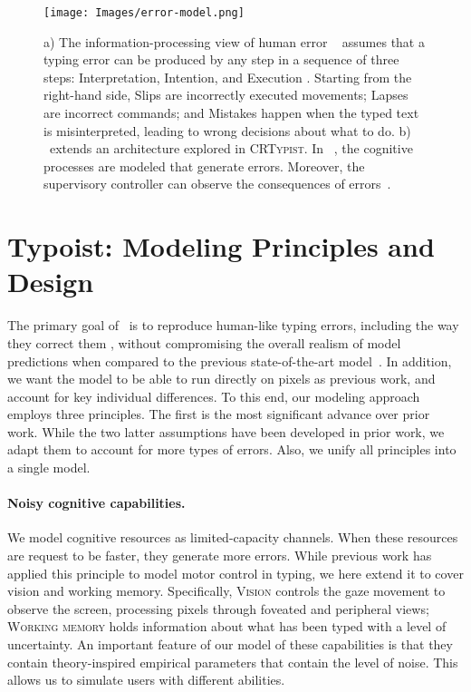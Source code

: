\begin{figure}[!t]
\centering
  \texttt{[image: Images/error-model.png]}
  \caption{
  a) The information-processing view of human error ~\cite{wickens2021engineering} assumes that a typing error can be produced by any step in a sequence of three steps: Interpretation, Intention, and Execution . 
  Starting from the right-hand side, Slips are incorrectly executed movements; 
  Lapses are incorrect commands; and Mistakes happen when the typed text is misinterpreted, leading to wrong decisions about what to do.
  b) ~\name extends an architecture explored in \textsc{CRTypist}. In ~\name, the cognitive processes are modeled that generate errors. Moreover, the supervisory controller can observe the consequences of errors~\cite{shi2024crtypist}.}
  \label{fig:model}
\end{figure}

\section{Typoist: Modeling Principles and Design}

The primary goal of ~\name is to reproduce human-like typing errors, including the way they correct them \cite{pinet2022correction}, without compromising the overall realism of model predictions when compared to the previous state-of-the-art model~\cite{shi2024crtypist}. In addition, we want the model to be able to run directly on pixels as previous work,
and account for key individual differences. To this end, our modeling approach employs three principles. The first is the most significant advance over prior work. While the two latter assumptions have been developed in prior work,
we adapt them to account for more types of errors. Also, we unify all principles into a single model. 

\paragraph{Noisy cognitive capabilities.} 
We model cognitive resources as limited-capacity channels. 
When these resources are request to be faster, they generate more errors.
While previous work has applied this principle to model motor control in typing, we here extend it to cover vision and working memory.
Specifically, \textsc{Vision} controls the gaze movement to observe the screen, processing pixels through foveated and peripheral views; \textsc{Working memory} holds information about what has been typed with a level of uncertainty.
An important feature of our model of these capabilities is that they contain theory-inspired empirical parameters that contain the level of noise. 
This allows us to simulate users with different abilities.

